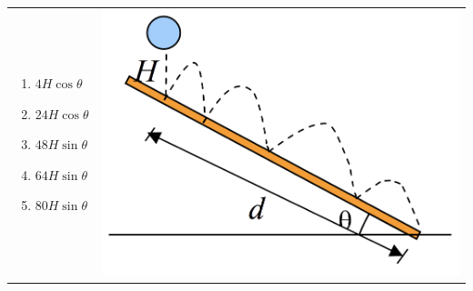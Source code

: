 \documentclass[12pt,letterpaper]{article}
\begin{document}
\begin{enumerate}[resume]
\begin{tabular}{l r}
\begin{minipage}{0.6\textwidth}
\begin{enumerate}
\item $4H\cos\theta$
\item $24H\cos\theta$
\item $48H\sin\theta$
\item $64H\sin\theta$
\item $80H\sin\theta$
\end{enumerate}
\end{minipage} &
\begin{minipage}{0.3\textwidth}
\includegraphics[width=\textwidth,left]{bounce2.png}
\end{minipage}
\end{tabular}

\end{enumerate}
\end{document}
